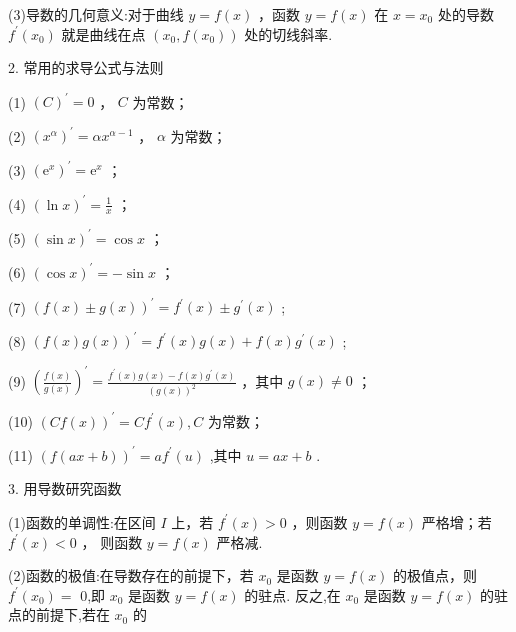 \documentclass[10pt]{article}
\begin{document}
(3)导数的几何意义:对于曲线 \(y = f\left( x\right)\) ，函数 \(y = f\left( x\right)\) 在 \(x = {x}_{0}\) 处的导数 \({f}^{\prime }\left( {x}_{0}\right)\) 就是曲线在点 \(\left( {{x}_{0},f\left( {x}_{0}\right) }\right)\) 处的切线斜率.

2. 常用的求导公式与法则

(1) \({\left( C\right) }^{\prime } = 0\) ， \(C\) 为常数；

(2) \({\left( {x}^{\alpha }\right) }^{\prime } = \alpha {x}^{\alpha  - 1}\) ， \(\alpha\) 为常数；

(3) \({\left( {\mathrm{e}}^{x}\right) }^{\prime } = {\mathrm{e}}^{x}\) ；

(4) \({\left( \ln x\right) }^{\prime } = \frac{1}{x}\) ；

(5) \({\left( \sin x\right) }^{\prime } = \cos x\) ；

(6) \({\left( \cos x\right) }^{\prime } =  - \sin x\) ；

(7) \({\left( f\left( x\right)  \pm  g\left( x\right) \right) }^{\prime } = {f}^{\prime }\left( x\right)  \pm  {g}^{\prime }\left( x\right)\) ;

(8) \({\left( f\left( x\right) g\left( x\right) \right) }^{\prime } = {f}^{\prime }\left( x\right) g\left( x\right)  + f\left( x\right) {g}^{\prime }\left( x\right)\) ;

(9) \({\left( \frac{f\left( x\right) }{g\left( x\right) }\right) }^{\prime } = \frac{{f}^{\prime }\left( x\right) g\left( x\right)  - f\left( x\right) {g}^{\prime }\left( x\right) }{{\left( g\left( x\right) \right) }^{2}}\) ，其中 \(g\left( x\right)  \neq  0\) ；

(10) \({\left( Cf\left( x\right) \right) }^{\prime } = C{f}^{\prime }\left( x\right) ,C\) 为常数；

(11) \({\left( f\left( ax + b\right) \right) }^{\prime } = a{f}^{\prime }\left( u\right)\) ,其中 \(u = {ax} + b\) .

3. 用导数研究函数

(1)函数的单调性:在区间 \(I\) 上，若 \({f}^{\prime }\left( x\right)  > 0\) ，则函数 \(y = f\left( x\right)\) 严格增；若 \({f}^{\prime }\left( x\right)  < 0\) ， 则函数 \(y = f\left( x\right)\) 严格减.

(2)函数的极值:在导数存在的前提下，若 \({x}_{0}\) 是函数 \(y = f\left( x\right)\) 的极值点，则 \({f}^{\prime }\left( {x}_{0}\right)  =\) 0,即 \({x}_{0}\) 是函数 \(y = f\left( x\right)\) 的驻点. 反之,在 \({x}_{0}\) 是函数 \(y = f\left( x\right)\) 的驻点的前提下,若在 \({x}_{0}\) 的
\end{document}
